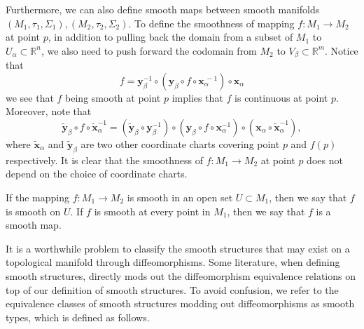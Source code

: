 \documentclass{report}
\begin{document}
Furthermore, we can also define smooth maps between smooth manifolds $(M_1,\tau_1,\Sigma_1), (M_2,\tau_2,\Sigma_2)$. To define the smoothness of mapping $f:M_1\to M_2$ at point $p$, in addition to pulling back the domain from a subset of $M_1$ to $U_\alpha\subset\mathbb{R}^n$, we also need to push forward the codomain from $M_2$ to $V_\beta\subset\mathbb{R}^m$.
Notice that
\[
    f = \mathbf{y}^{-1}_\beta\circ(\mathbf{y}_\beta \circ f\circ \mathbf{x}^{\hspace{2pt}-1}_\alpha)\circ\mathbf{x}_\alpha
\]
we see that $f$ being smooth at point $p$ implies that $f$ is continuous at point $p$.
Moreover, note that 
\[
    \tilde{\mathbf{y}}_\beta \circ f\circ \tilde{\mathbf{x}}_\alpha^{-1}=(\tilde{\mathbf{y}}_\beta\circ\mathbf{y}_\beta^{-1}) \circ(\mathbf{y}_\beta \circ f\circ \mathbf{x}_\alpha^{-1})\circ(\mathbf{x}_\alpha\circ \tilde{\mathbf{x}}_\alpha^{-1}),
\]
where $\tilde{\mathbf{x}}_\alpha$ and $\tilde{\mathbf{y}}_\beta$ are two other coordinate charts covering point $p$ and $f(p)$ respectively. It is clear that the smoothness of $f:M_1\to M_2$ at point $p$ does not depend on the choice of coordinate charts.

If the mapping $f:M_1\to M_2$ is smooth in an open set $U\subset M_1$, then we say that $f$ is smooth on $U$. If $f$ is smooth at every point in $M_1$, then we say that $f$ is a smooth map.


It is a worthwhile problem to classify the smooth structures that may exist on a topological manifold through diffeomorphisms. Some literature, when defining smooth structures, directly mods out the diffeomorphism equivalence relations on top of our definition of smooth structures. To avoid confusion, we refer to the equivalence classes of smooth structures modding out diffeomorphisms as smooth types, which is defined as follows.
\end{document}
